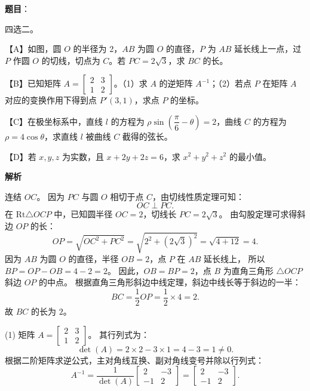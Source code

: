 \begin{answer}

\textbf{题目}：

四选二。

【A】如图，圆 $O$ 的半径为 2，$AB$ 为圆 $O$ 的直径，$P$ 为 $AB$ 延长线上一点，过 $P$ 作圆 $O$ 的切线，切点为 $C$。若 $PC = 2\sqrt{3}$，求 $BC$ 的长。
\nopagebreak[4]
\begin{center}\end{center}
\nopagebreak[4]
【B】已知矩阵 $A = \begin{bmatrix} 2 & 3 \\ 1 & 2 \end{bmatrix}$。（1）求 $A$ 的逆矩阵 $A^{-1}$；（2）若点 $P$ 在矩阵 $A$ 对应的变换作用下得到点 $P'(3, 1)$，求点 $P$ 的坐标。

【C】在极坐标系中，直线 $l$ 的方程为 $\rho \sin\left(\dfrac{\pi}{6} - \theta\right) = 2$，曲线 $C$ 的方程为 $\rho = 4\cos\theta$，求直线 $l$ 被曲线 $C$ 截得的弦长。

【D】若 $x, y, z$ 为实数，且 $x + 2y + 2z = 6$，求 $x^2 + y^2 + z^2$ 的最小值。

\textbf{解析}

连结 $OC$。
因为 $PC$ 与圆 $O$ 相切于点 $C$，由切线性质定理可知：
\nopagebreak[4]
\[OC \perp PC.\]
在 $\text{Rt}\triangle OCP$ 中，已知圆半径 $OC = 2$，切线长 $PC = 2\sqrt{3}$。
由勾股定理可求得斜边 $OP$ 的长：
\nopagebreak[4]
\[OP = \sqrt{OC^2 + PC^2} = \sqrt{2^2 + (2\sqrt{3})^2} = \sqrt{4 + 12} = 4.\]
因为 $AB$ 为圆 $O$ 的直径，半径 $OB = 2$，点 $P$ 在 $AB$ 延长线上，
所以 $BP = OP - OB = 4 - 2 = 2$。
因此，$OB = BP = 2$，点 $B$ 为直角三角形 $\triangle OCP$ 斜边 $OP$ 的中点。
根据直角三角形斜边中线定理，斜边中线长等于斜边的一半：
\nopagebreak[4]
\[BC = \frac{1}{2} OP = \frac{1}{2} \times 4 = 2.\]
故 $BC$ 的长为 $2$。

(1) 矩阵 $A = \begin{bmatrix} 2 & 3 \\ 1 & 2 \end{bmatrix}$。
其行列式为：
\nopagebreak[4]
\[\det(A) = 2 \times 2 - 3 \times 1 = 4 - 3 = 1 \ne 0.\]
根据二阶矩阵求逆公式，主对角线互换、副对角线变号并除以行列式：
\nopagebreak[4]
\[A^{-1} = \frac{1}{\det(A)} \begin{bmatrix} 2 & -3 \\ -1 & 2 \end{bmatrix} = \begin{bmatrix} 2 & -3 \\ -1 & 2 \end{bmatrix}.\]


\end{answer}
